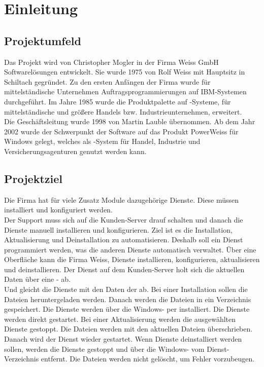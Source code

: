 \section{Einleitung}
\label{sec:Einleitung}


\subsection{Projektumfeld} 
\label{sec:Projektumfeld}
Das Projekt wird von Christopher Mogler in der Firma Weiss GmbH Softwarelösungen
entwickelt. Sie wurde 1975 von Rolf Weiss mit Hauptsitz in Schiltach gegründet. Zu den ersten
Anfängen der Firma wurde für mittelständische Unternehmen Auftragsprogrammierungen auf
IBM-Systemen durchgeführt. Im Jahre 1985 wurde die Produktpalette auf -Systeme, für
mittelständische und größere Handels bzw. Industrieunternehmen, erweitert. \\
Die Geschäftsleitung wurde 1998 von Martin Lauble übernommen. Ab dem Jahr 2002 wurde der
Schwerpunkt der Software auf das Produkt PowerWeiss für Windows gelegt, welches als
-System für Handel, Industrie und Versicherungsagenturen genutzt werden kann.

\subsection{Projektziel} 
\label{sec:Projektziel}
Die Firma hat für viele Zusatz Module dazugehörige Dienste. Diese müssen installiert und konfiguriert werden. \\
Der Support muss sich auf die Kunden-Server drauf schalten und danach die Dienste manuell installieren und konfigurieren. Ziel ist es die Installation, Aktualisierung und Deinstallation zu automatisieren.
Deshalb soll ein Dienst programmiert werden, was die anderen Dienste automatisch verwaltet. 
Über eine Oberfläche kann die Firma Weiss, Dienste installieren, konfigurieren, aktualisieren und deinstallieren. Der Dienst auf dem Kunden-Server holt sich die aktuellen Daten über eine - ab. \\
Und gleicht die Dienste mit den Daten der  ab. 
Bei einer Installation sollen die Dateien heruntergeladen werden. Danach werden die Dateien in ein Verzeichnis gespeichert. Die Dienste werden über die Windows- per  installiert. Die Dienste werden direkt gestartet.
Bei einer Aktualisierung werden die ausgewählten Dienste gestoppt. Die Dateien werden mit den aktuellen Dateien überschrieben. Danach wird der Dienst wieder gestartet.
Wenn Dienste deinstalliert werden sollen, werden die Dienste gestoppt und über die Windows- vom Dienst-Verzeichnis entfernt. Die Dateien werden nicht gelöscht, um Fehler vorzubeugen.
